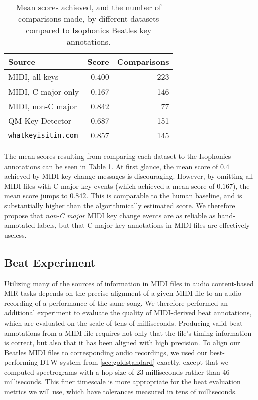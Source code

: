 \begin{table}
\begin{center}
\begin{tabular}{lrr}
  \toprule
  Source                     & Score & Comparisons \\
  \midrule
  MIDI, all keys             & 0.400 &         223 \\
  MIDI, C major only         & 0.167 &         146 \\
  MIDI, non-C major          & 0.842 &          77 \\
  QM Key Detector            & 0.687 &         151 \\
  \texttt{whatkeyisitin.com} & 0.857 &         145 \\
  \bottomrule
\end{tabular}
\end{center}
  \caption{Mean scores achieved, and the number of comparisons made, by different datasets compared to Isophonics Beatles key annotations.}
  \label{tab:key}
\end{table}

The mean scores resulting from comparing each dataset to the Isophonics annotations can be seen in Table \ref{tab:key}.
At first glance, the mean score of $0.4$ achieved by MIDI key change messages is discouraging.
However, by omitting all MIDI files with C major key events (which achieved a mean score of $0.167$), the mean score jumps to $0.842$.
This is comparable to the human baseline, and is substantially higher than the algorithmically estimated score.
We therefore propose that \textit{non-C major} MIDI key change events are as reliable as hand-annotated labels, but that C major key annotations in MIDI files are effectively useless.

\subsection{Beat Experiment}

Utilizing many of the sources of information in MIDI files in audio content-based MIR tasks depends on the precise alignment of a given MIDI file to an audio recording of a performance of the same song.
We therefore performed an additional experiment to evaluate the quality of MIDI-derived beat annotations, which are evaluated on the scale of tens of milliseconds.
Producing valid beat annotations from a MIDI file requires not only that the file's timing information is correct, but also that it has been aligned with high precision.
To align our Beatles MIDI files to corresponding audio recordings, we used our best-performing DTW system from \cref{sec:goldstandard} exactly, except that we computed spectrograms with a hop size of 23 milliseconds rather than 46 milliseconds.
This finer timescale is more appropriate for the beat evaluation metrics we will use, which have tolerances measured in tens of milliseconds.

